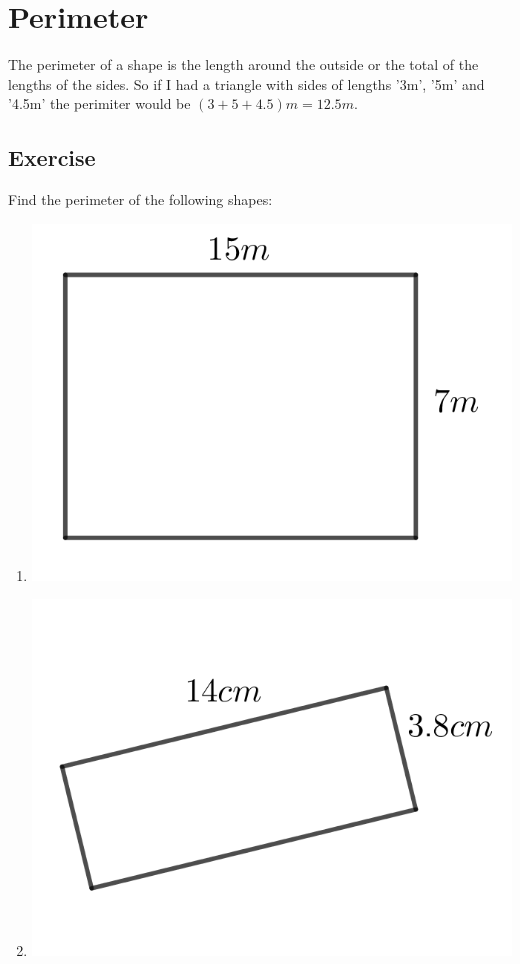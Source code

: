 \section{Perimeter}
The perimeter of a shape is the length around the outside or the total of the lengths of the sides.  So if I had a triangle with sides of lengths '3m', '5m' and '4.5m' the perimiter would be $(3+5+4.5)m = 12.5m$.
\subsection{Exercise}
Find the perimeter of the following shapes:
\begin{multicols}{2}
\begin{enumerate}
	\item \includegraphics{./Images/Measurement/perimeter1.png}
	\item \includegraphics{./Images/Measurement/perimeter2.png}

\end{enumerate}
\end{multicols}
